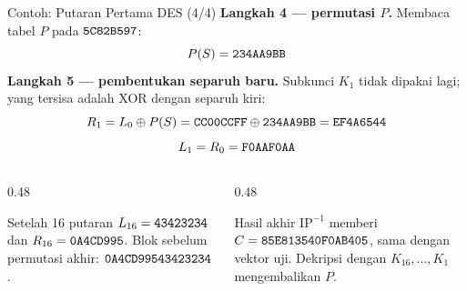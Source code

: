 \documentclass[aspectratio=169,11pt]{beamer}
\begin{document}
\begin{frame}{Contoh: Putaran Pertama DES (4/4)}
    \footnotesize
    \textbf{Langkah 4 --- permutasi $P$.}
    Membaca tabel $P$ pada $\texttt{5C82B597}$:
    \[
        P(S)=\texttt{234AA9BB}
    \]
    \textbf{Langkah 5 --- pembentukan separuh baru.}
    Subkunci $K_1$ tidak dipakai lagi; yang tersisa adalah XOR dengan
    separuh kiri:
    \[
        R_1=L_0\oplus P(S)
        =\texttt{CC00CCFF}\oplus\texttt{234AA9BB}
        =\texttt{EF4A6544}
    \]
    \[
        L_1=R_0=\texttt{F0AAF0AA}
    \]
    \begin{columns}[T,onlytextwidth]
        \begin{column}{0.48\textwidth}
            \begin{block}{Setelah 16 putaran}
                \footnotesize
                $L_{16}=\texttt{43423234}$ dan
                $R_{16}=\texttt{0A4CD995}$. Blok sebelum permutasi akhir:
                $\texttt{0A4CD99543423234}$.
            \end{block}
        \end{column}
        \begin{column}{0.48\textwidth}
            \begin{exampleblock}{Hasil akhir}
                \footnotesize
                $\mathrm{IP}^{-1}$ memberi
                $C=\texttt{85E813540F0AB405}$, sama dengan vektor uji.
                Dekripsi dengan $K_{16},\dots,K_1$ mengembalikan $P$.
            \end{exampleblock}
        \end{column}
    \end{columns}
\end{frame}
\end{document}

